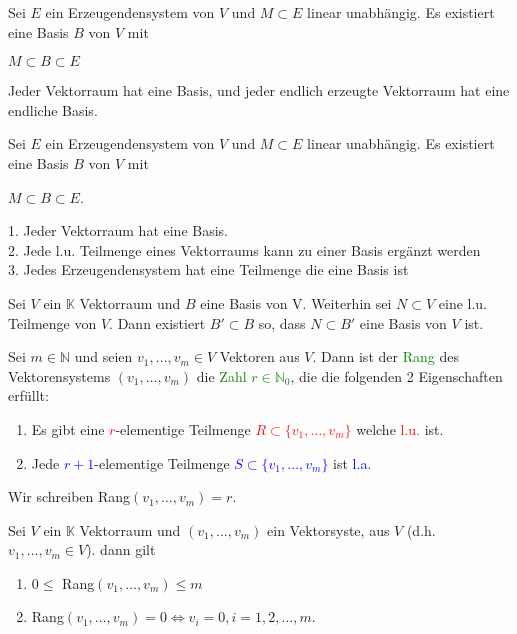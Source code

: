 \begin{theorem}
Sei $E$ ein Erzeugendensystem von $V$ und $M \subset E$ linear unabhängig. Es existiert eine Basis $B$ von $V$ mit 
\begin{center}
    $M \subset B \subset E$
\end{center}
\end{theorem}
\begin{theorem}
Jeder Vektorraum hat eine Basis, und jeder endlich erzeugte Vektorraum hat eine endliche Basis.
\end{theorem}
\begin{theorem}
Sei $E$ ein Erzeugendensystem von $V$ und $M \subset E$ linear unabhängig. Es existiert eine Basis $B$ von $V$ mit 
\begin{center}
    $M \subset B \subset E$.
\end{center}
\end{theorem}
\begin{theorem}
1. Jeder Vektorraum hat eine Basis.\\
2. Jede l.u. Teilmenge eines Vektorraums kann zu einer Basis ergänzt werden\\
3. Jedes Erzeugendensystem hat eine Teilmenge die eine Basis ist
\end{theorem}
\begin{theorem}
Sei $V$ ein $\mathbb{K}$ Vektorraum und $B$ eine Basis von V. Weiterhin sei $N \subset V$ eine l.u. Teilmenge von $V$. Dann existiert $B' \subset B$ so, dass $N \subset B'$ eine Basis von $V$ ist.
\end{theorem}
\begin{theorem}
Sei $m \in \mathbb{N}$ und seien $v_1, \dots, v_m \in V$ Vektoren aus $V$. Dann ist der \textcolor{green}{Rang} des Vektorensystems $(v_1, \dots, v_m)$ die \textcolor{green}{Zahl $r \in \mathbb{N}_0$}, die die folgenden 2 Eigenschaften erfüllt:
\begin{enumerate}
    \item Es gibt eine \textcolor{red}{$r$}-elementige Teilmenge \textcolor{red}{$R \subset \{v_1, \dots, v_m\}$} welche \textcolor{red}{l.u.} ist.
    \item Jede \textcolor{blue}{$r+1$}-elementige Teilmenge \textcolor{blue}{$S \subset \{v_1, \dots, v_m\}$} ist \textcolor{blue}{l.a.}
\end{enumerate}
Wir schreiben Rang$(v_1,\dots,v_m) = r$.
\end{theorem}
\begin{theorem}
Sei $V$ ein $\mathbb{K}$ Vektorraum und $(v_1,\dots,v_m)$ ein Vektorsyste, aus $V$ (d.h. $v_1,\dots,v_m \in V$). dann gilt
\begin{enumerate}
    \item $0 \leq$ Rang$(v_1,\dots,v_m) \leq m$
    \item Rang$(v_1,\dots,v_m) = 0 \Leftrightarrow v_i = 0, i = 1,2,\dots, m.$
\end{enumerate}
\end{theorem}
